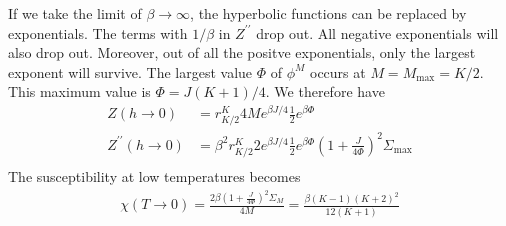 \documentclass{revtex4-2}
\begin{document}
If we take the limit of \(\beta \to \infty\), the hyperbolic functions can be replaced by exponentials. The terms with \(1/\beta\) in \(Z^{\prime\prime}\) drop out. All negative exponentials will also drop out. Moreover, out of all the positve exponentials, only the largest exponent will survive. The largest value \(\Phi\) of \(\phi^M\) occurs at \(M = M_\text{max} = K/2\). This maximum value is \(\Phi = J(K+1)/4\). We therefore have
\begin{align}
	     Z(h \to 0) &= r^K_{K/2} 4Me^{\beta J/4}\frac{1}{2}e^{\beta\Phi}\\
	     Z^{\prime\prime}(h \to 0) &=\beta^2 r^K_{K/2}2 e^{\beta J/4}\frac{1}{2}e^{\beta \Phi}\left(1 + \frac{J}{4\Phi}\right)^2\Sigma_\text{max}\\
\end{align}
The susceptibility at low temperatures becomes
\begin{align}
	\chi(T \to 0) = \frac{2\beta\left(1 + \frac{J}{4\Phi}\right)^2\Sigma_M}{4M} = \frac{\beta (K-1)(K+2)^2}{12(K+1)}
\end{align}
\end{document}
